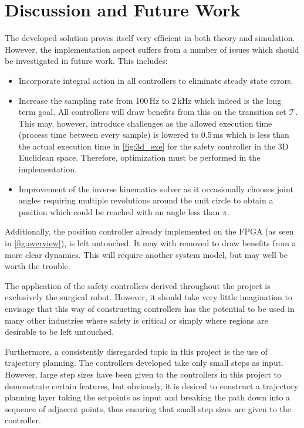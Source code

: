 \section*{Discussion and Future Work}
The developed solution proves itself very efficient in both theory and simulation. However, the implementation aspect suffers from a number of issues which should be investigated in future work. This includes:
\begin{itemize}
\item Incorporate integral action in all controllers to eliminate steady state errors.
\item Increase the sampling rate from 100\,Hz to 2\,kHz which indeed is the long term goal. All controllers will draw benefits from this on the transition set $\mathcal{T}$. This may, however, introduce challenges as the allowed execution time (process time between every sample) is lowered to 0.5\,ms which is less than the actual execution time in \autoref{fig:3d_exe} for the safety controller in the 3D Euclidean space. Therefore, optimization must be performed in the implementation.
\item Improvement of the inverse kinematics solver as it occasionally chooses joint angles requiring multiple revolutions around the unit circle to obtain a position which could be reached with an angle less than $\pi$.
\end{itemize}
Additionally, the position controller already implemented on the FPGA (as seen in \autoref{fig:overview}), is left untouched. It may with removed to draw benefits from a more clear dynamics. This will require another system model, but may well be worth the trouble.

The application of the safety controllers derived throughout the project is exclusively the surgical robot. However, it should take very little imagination to envisage that this way of constructing controllers has the potential to be used in many other industries where safety is critical or simply where regions are desirable to be left untouched.

Furthermore, a consistently disregarded topic in this project is the use of trajectory planning. The controllers developed take only small steps as input. However, large step sizes have been given to the controllers in this project to demonstrate certain features, but obviously, it is desired to construct a trajectory planning layer taking the setpoints as input and breaking the path down into a sequence of adjacent points, thus ensuring that small step sizes are given to the controller.

